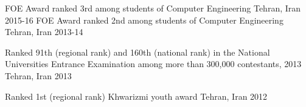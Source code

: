 
\begin{cvhonors}

  \cvhonor
    {FOE Award} %
    {ranked 3rd among students of Computer Engineering} %
    {Tehran, Iran} %
    {2015-16} %
  \cvhonor
    {FOE Award} %
    {ranked 2nd among students of Computer Engineering} %
    {Tehran, Iran} %
    {2013-14} %

  \cvhonor
    {Ranked 91th (regional rank)} %
    {and 160th (national rank) in the National Universities Entrance
Examination among more than 300,000 contestants, 2013} %
    {Tehran, Iran} %
    {2013} %
   
  \cvhonor
    {Ranked 1st (regional rank)} %
    {Khwarizmi youth award} %
    {Tehran, Iran} %
    {2012} %

\end{cvhonors}